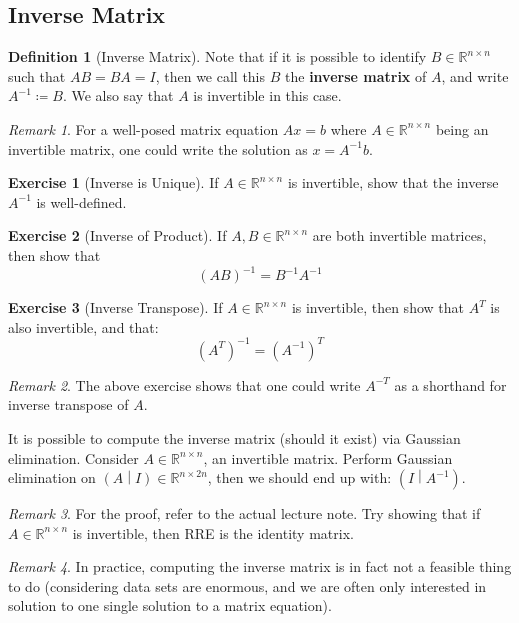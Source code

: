 \documentclass[12pt, a4paper]{article}
\newcommand{\R}{\mathbb{R}}
\theoremstyle{remark}
\newtheorem{remark}{Remark}
\theoremstyle{definition}
\newtheorem{definition}{Definition}
\newtheorem{exercise}{Exercise}
\numberwithin{equation}{section}
\numberwithin{definition}{section}
\numberwithin{example}{section}
\numberwithin{exercise}{section}
\numberwithin{remark}{section}
\numberwithin{figure}{section}
\begin{document}
\subsection{Inverse Matrix}
\begin{definition}[Inverse Matrix]
    Note that if it is possible to identify $B \in \R^{n \times n}$ such that $AB = BA = I$, then we call this $B$ the \textbf{inverse matrix} of $A$, and write $A^{-1} \coloneqq B$.
    We also say that $A$ is invertible in this case.
\end{definition}
\begin{remark}
    For a well-posed matrix equation $Ax = b$ where $A \in \R^{n \times n}$ being an invertible matrix,
    one could write the solution as $x = A^{-1} b$.
\end{remark}
\begin{exercise}[Inverse is Unique]
    If $A \in \R^{n \times n}$ is invertible, show that the inverse $A^{-1}$ is well-defined.
\end{exercise}
\begin{exercise}[Inverse of Product]
    If $A,B \in \R^{n \times n}$ are both invertible matrices, then show that
    \begin{equation*}
        \left( AB \right)^{-1} = B^{-1}A^{-1}
    \end{equation*}
\end{exercise}
\begin{exercise}[Inverse Transpose]
    If $A \in \R^{n \times n}$ is invertible, then show that $A^{T}$ is also invertible,
    and that:
    \begin{equation*}
        \left( A^T \right)^{-1} = \left( A^{-1} \right)^T
    \end{equation*}
\end{exercise}
\begin{remark}
    The above exercise shows that one could write $A^{-T}$ as a shorthand for inverse transpose of $A$.
\end{remark}
It is possible to compute the inverse matrix (should it exist) via Gaussian elimination.
Consider $A \in \R^{n \times n}$, an invertible matrix.
Perform Gaussian elimination on $\left( A \middle| I \right) \in \R^{n \times 2n}$, then we should end up with:
$\left( I \middle| A^{-1} \right)$.
\begin{remark}
    For the proof, refer to the actual lecture note. Try showing that if $A \in \R^{n \times n}$ is invertible, then RRE is the identity matrix.
\end{remark}
\begin{remark}
    In practice, computing the inverse matrix is in fact not a feasible thing to do (considering data sets are enormous, and we are often only interested in solution to one single solution to a matrix equation).
\end{remark}
\end{document}
